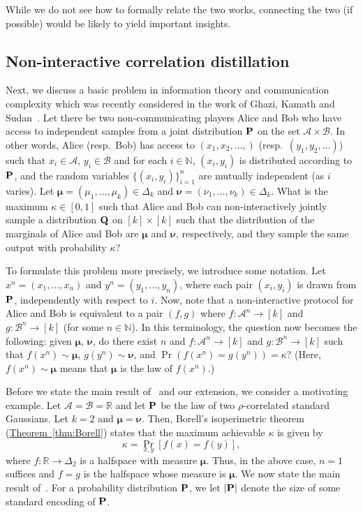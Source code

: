 \documentclass[11pt]{article}
\numberwithin{equation}{section}
\theoremstyle{definition}
\theoremstyle{plain}
\newcommand{\expref}[2]{\hyperref[#2]{#1~\ref{#2}}}
\newcommand{\bP}{{\bf P}}
\newcommand{\bQ}{{\bf Q}}
\begin{document}
While we do not see how to formally relate the two works, connecting the two
(if possible) would be likely to yield important insights.

\subsection{Non-interactive correlation distillation}
Next, we discuss a basic problem in information theory and communication
complexity which was recently considered in the work of Ghazi, Kamath and
Sudan~\cite{GKS:16}.  Let there be two non-communicating players Alice and Bob
who have access to independent samples from a joint distribution $\bP$ on the set $\mathcal{A} \times \mathcal{B}$. In other words, Alice
(resp.\ Bob) has access to $(x_1, x_2, \ldots, )$ (resp.\ $(y_1, y_2, \ldots)$)
such that $x_i \in \mathcal{A}$, $y_i \in \mathcal{B}$ and for each $i \in
\mathbb{N}$, $(x_i, y_i)$ is distributed according to $\bP$, and the random
variables $\{(x_i, y_i)\}_{i=1}^n$ are mutually independent (as $i$ varies).
Let $\boldsymbol{\mu} = (\mu_1, \ldots, \mu_k) \in \Delta_k$ and
$\boldsymbol{\nu} = (\nu_1, \ldots, \nu_k) \in \Delta_k$.  What is the maximum
$\kappa \in [0,1]$ such that Alice and Bob can non-interactively jointly sample
a distribution $\bQ$ on $[k] \times [k]$ such that the distribution of the
marginals of Alice and Bob are $\boldsymbol{\mu}$ and $\boldsymbol{\nu}$,
%
respectively, and they sample the same output with probability $\kappa$? 

To formulate this problem more precisely, we introduce some notation.  Let $x^n
= (x_1, \dots, x_n)$ and $y^n = (y_1, \dots, y_n)$, where each pair $(x_i,
y_i)$ is drawn from $\bP$, independently with respect to $i$.  Now, note that a
non-interactive protocol for Alice and Bob is equivalent to a pair $(f,g)$
where 
$f: \mathcal{A}^n \rightarrow [k]$ and $g: \mathcal{B}^n \rightarrow [k]$ (for some $n \in \mathbb{N}$). 
In this terminology, the question now becomes the following: given
$\boldsymbol{\mu}$, $\boldsymbol{\nu}$, do there exist $n$ and $f:
\mathcal{A}^n \rightarrow [k]$ and $g: \mathcal{B}^n \rightarrow [k]$ such that
$f(x^n) \sim \boldsymbol{\mu}$,
$g(y^n) \sim \boldsymbol{\nu}$, and
$\Pr(f(x^n) = g(y^n)) = \kappa$?
(Here, $f(x^n) \sim \boldsymbol{\mu}$ means that $\boldsymbol{\mu}$ is the law
of $f(x^n)$.)

Before we state the main result of~\cite{GKS:16} and our extension, we consider
a motivating example. Let $\mathcal{A}= \mathcal{B}= \mathbb{R}$ and let $\bP$ be
the law of two $\rho$-correlated standard Gaussians. Let $k=2$ and
$\boldsymbol{\mu} = \boldsymbol{\nu}$.  Then, Borell's isoperimetric theorem
(\expref{Theorem}{thm:Borell})
states that the maximum achievable $\kappa$ is given by 
\[
\kappa = \Pr_{x,y}[f(x) = f(y)],
\]
where $f : \mathbb{R} \rightarrow \Delta_2$ is a halfspace with measure $\boldsymbol{\mu}$. Thus, in the above case, $n=1$ suffices and $f=g$ is the halfspace whose measure is $\boldsymbol{\mu}$. We now state the main result of~\cite{GKS:16}. For a probability distribution $\bP$, we let $|\bP|$ denote the size of some standard encoding of $\bP$. 
\end{document}
